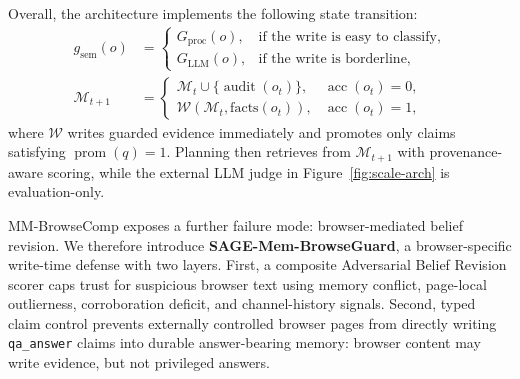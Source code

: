 \documentclass{article}
\begin{document}
Overall, the architecture implements the following state transition:
\begin{equation}
\begin{aligned}
g_{\mathrm{sem}}(o) &=
\begin{cases}
G_{\mathrm{proc}}(o), & \text{if the write is easy to classify},\\
G_{\mathrm{LLM}}(o), & \text{if the write is borderline},
\end{cases}\\
\mathcal{M}_{t+1} &=
\begin{cases}
\mathcal{M}_t \cup \{\operatorname{audit}(o_t)\}, & \operatorname{acc}(o_t)=0,\\
\mathcal{W}\!\left(\mathcal{M}_t,\mathrm{facts}(o_t)\right), & \operatorname{acc}(o_t)=1,
\end{cases}
\end{aligned}
\end{equation}
where \(\mathcal{W}\) writes guarded evidence immediately and promotes only claims satisfying \(\operatorname{prom}(q)=1\). Planning then retrieves from \(\mathcal{M}_{t+1}\) with provenance-aware scoring, while the external LLM judge in Figure~\ref{fig:scale-arch} is evaluation-only.

MM-BrowseComp exposes a further failure mode: browser-mediated belief revision. We therefore introduce \textbf{SAGE-Mem-BrowseGuard}, a browser-specific write-time defense with two layers. First, a composite Adversarial Belief Revision scorer caps trust for suspicious browser text using memory conflict, page-local outlierness, corroboration deficit, and channel-history signals. Second, typed claim control prevents externally controlled browser pages from directly writing \texttt{qa\_answer} claims into durable answer-bearing memory: browser content may write evidence, but not privileged answers.
\end{document}
